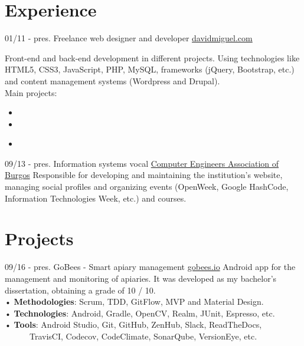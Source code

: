 \documentclass[]{friggeri-cv}
\begin{document}
\section{Experience}
\begin{entrylist}
    \entry
    {01/11 - pres.}
    {Freelance web designer and developer}
    {\href{http://davidmiguel.com/}{davidmiguel.com}}
    {Front-end and back-end development in different projects. Using technologies like HTML5, CSS3, JavaScript, PHP, MySQL, frameworks (jQuery, Bootstrap, etc.) and content management systems (Wordpress and Drupal).
    \\ [2mm]
    Main projects:
    \begin{itemize}[noitemsep]
        \item {} 
        \item {}         
        \item {} \\
    \end{itemize}    
    }
    \entry
    {09/13 - pres.}
    {Information systems vocal}
    {\href{http://abi2burgos.es/}{Computer Engineers Association of Burgos}}
    {Responsible for developing and maintaining the institution's website, managing social profiles and organizing events (OpenWeek, Google HashCode, Information Technologies Week, etc.) and courses.\\}
\end{entrylist}

\section{Projects}
\begin{entrylist}
  \entry
    {09/16 - pres.}
    {GoBees - Smart apiary management}
    {\href{http://gobees.io/}{gobees.io}}
    {Android app for the management and monitoring of apiaries.
    It was developed as my bachelor's dissertation, obtaining a grade of 10 / 10.
    \\ [2mm]
    • \textbf{Methodologies}: Scrum, TDD, GitFlow, MVP and Material Design.\\
    • \textbf{Technologies}: Android, Gradle, OpenCV, Realm, JUnit,  Espresso, etc.\\
    • \textbf{Tools}: Android Studio, Git, GitHub, ZenHub, Slack, ReadTheDocs,\\       TravisCI, Codecov, CodeClimate, SonarQube, VersionEye, etc.\\}
\end{entrylist}
\end{document}

